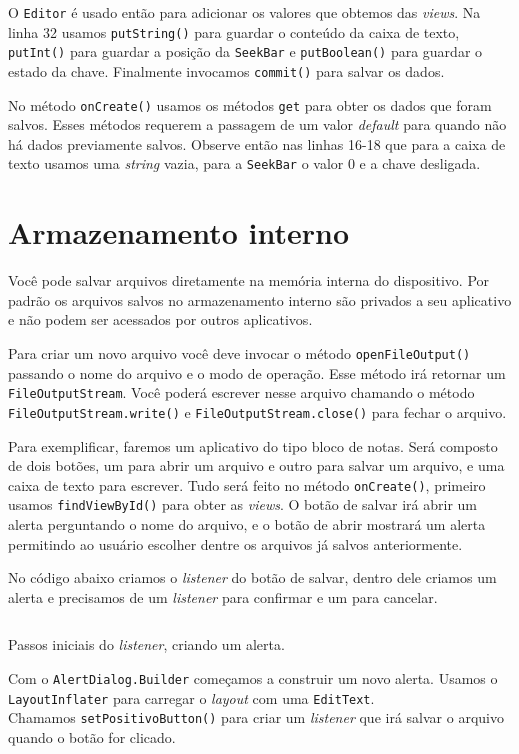 \documentclass[a4paper,12pt,brazil,oneside]{book}
\begin{document}
		O \texttt{Editor} é usado então para adicionar os valores que obtemos das \emph{views}. Na linha 32 usamos \texttt{putString()} para guardar o conteúdo da caixa de texto,
\texttt{putInt()} para guardar a posição da \texttt{SeekBar} e \texttt{putBoolean()} para guardar o estado da chave. Finalmente invocamos \texttt{commit()} para salvar os dados.

		No método \texttt{onCreate()} usamos os métodos \texttt{get} para obter os dados que foram salvos. Esses métodos requerem a passagem de um valor \emph{default} para quando não há dados previamente salvos. Observe então nas linhas 16-18 que para a caixa de texto usamos uma \emph{string} vazia, para a \texttt{SeekBar} o valor 0 e a chave desligada.


		\section{Armazenamento interno}

		Você pode salvar arquivos diretamente na memória interna do dispositivo. Por padrão os arquivos salvos no armazenamento interno são privados a seu aplicativo e não podem ser acessados por outros aplicativos. 

		Para criar um novo arquivo você deve invocar o método \texttt{openFileOutput()} passando o nome do arquivo e o modo de operação. Esse método irá retornar um \texttt{FileOutputStream}. Você poderá escrever nesse arquivo chamando o método \texttt{FileOutputStream.write()} e \texttt{FileOutputStream.close()} para fechar o arquivo.

		Para exemplificar, faremos um aplicativo do tipo bloco de notas. Será composto de dois botões, um para abrir um arquivo e outro para salvar um arquivo, e uma caixa de texto para escrever. Tudo será feito no método \texttt{onCreate()}, primeiro  usamos \texttt{findViewById()} para obter as \emph{views}. O botão de salvar irá abrir um alerta perguntando o nome do arquivo, e o botão de abrir mostrará um alerta permitindo ao usuário escolher dentre os arquivos já salvos anteriormente.

		No código abaixo criamos o \emph{listener} do botão de salvar, dentro dele criamos um alerta e precisamos de um \emph{listener} para confirmar e um para cancelar.

		\begin{listing}[H]
		\inputminted[linenos=true,fontsize=\small,frame=lines, framesep=2mm, tabsize=2,numbersep=5pt]{java}{src/api/storage/internal1.java}
		\caption{Passos iniciais do \emph{listener}, criando um alerta.}
		\label{code:internal1}
		\end{listing} 	
		\newpage
		Com o \texttt{AlertDialog.Builder} começamos a construir um novo alerta. Usamos o \texttt{LayoutInflater} para carregar o \emph{layout} com uma \texttt{EditText}.
		\\ Chamamos \texttt{setPositivoButton()} para criar um \emph{listener} que irá salvar o arquivo quando o botão for clicado.
\end{document}
